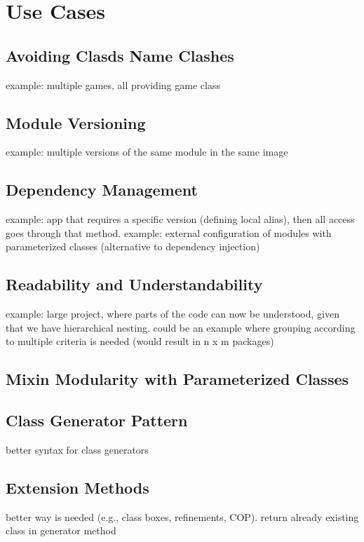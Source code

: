 \chapter{Use Cases}

\section{Avoiding Clasds Name Clashes}
example: multiple games, all providing game class

\section{Module Versioning}
example: multiple versions of the same module in the same image

\section{Dependency Management}
example: app that requires a specific version (defining local alias), then all access goes through that method. example: external configuration of modules with parameterized classes (alternative to dependency injection)

\section{Readability and Understandability}
example: large project, where parts of the code can now be understood, given that we have hierarchical nesting. could be an example where grouping according to multiple criteria is needed (would result in n x m packages)

\section{Mixin Modularity with Parameterized Classes}

\section{Class Generator Pattern}
better syntax for class generators

\section{Extension Methods}
better way is needed (e.g., class boxes, refinements, COP). return already existing class in generator method
